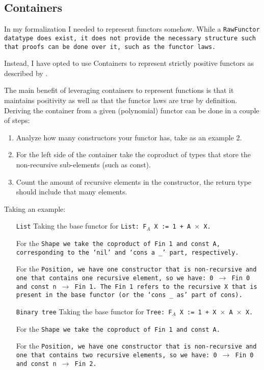 
\subsection{Containers}
In my formalization I needed to represent functors somehow.
While a \tt{RawFunctor} datatype does exist, it does not provide the necessary structure such that proofs can be done over it, such as the functor laws.

Instead, I have opted to use Containers to represent strictly positive functors as described by \cite{Abbott2005}.


The main benefit of leveraging containers to represent functions is that it maintains positivity as well as that the functor laws are true by definition.
Deriving the container from a given (polynomial) functor can be done in a couple of steps:
\begin{enumerate}
    \item Analyze how many constructors your functor has, take as an example 2.
    \item For the left side of the container take the coproduct of types that store the non-recursive sub-elements (such as const).
    \item Count the amount of recursive elements in the constructor, the return type should include that many elements.
\end{enumerate}
Taking an example:
\begin{itemize}
    \item[\tt{List}]
    Taking the base functor for \tt{List}: \tt{F$_A$ X := 1 + A $\times$ X}.

    For the \tt{Shape} we take the coproduct of \tt{Fin 1} and \tt{const A}, corresponding to the `\tt{nil}' and `\tt{cons a \_}' part, respectively.

    For the \tt{Position}, we have one constructor that is non-recursive and one that contains one recursive element, so we have:
    \tt{0 $\to$ Fin 0} and \tt{const n $\to$ Fin 1}.
    The Fin 1 refers to the recursive X that is present in the base functor (or the `\tt{cons \_ as}' part of cons).
    \item[\tt{Binary tree}]
    Taking the base functor for \tt{Tree}: \tt{F$_A$ X := 1 + X $\times$ A $\times$ X}.

    For the \tt{Shape} we take the coproduct of \tt{Fin 1} and \tt{const A}.

    For the \tt{Position}, we have one constructor that is non-recursive and one that contains two recursive elements, so we have:
    \tt{0 $\to$ Fin 0} and \tt{const n $\to$ Fin 2}.
\end{itemize}
